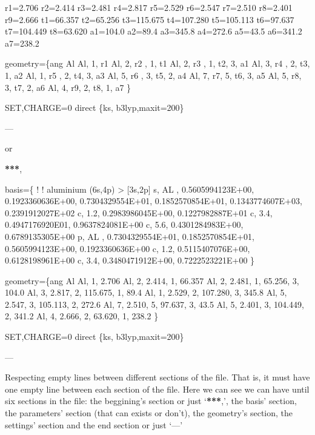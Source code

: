 \documentclass[letterpaper,10pt,english]{sphinxmanual}
\begin{document}
\begin{fulllineitems}
\begin{fulllineitems}
\sphinxAtStartPar
r1=2.706
r2=2.414
r3=2.481
r4=2.817
r5=2.529
r6=2.547
r7=2.510
r8=2.401
r9=2.666
t1=66.357
t2=65.256
t3=115.675
t4=107.280
t5=105.113
t6=97.637
t7=104.449
t8=63.620
a1=104.0
a2=89.4
a3=345.8
a4=272.6
a5=43.5
a6=341.2
a7=238.2

\sphinxAtStartPar
geometry=\{ang
Al
Al,  1,     r1
Al,  2,     r2 ,    1,      t1
Al,  2,     r3 ,    1,     t2,       3,    a1
Al,  3,     r4 ,    2,     t3,       1,     a2
Al,  1,     r5 ,    2,     t4,       3,    a3
Al,  5,     r6 ,    3,     t5,       2,    a4
Al,  7,     r7,     5,      t6,      3,     a5
Al,  5,     r8,     3,      t7,      2,    a6
Al,  4,     r9,     2,      t8,      1,     a7
\}

\sphinxAtStartPar
SET,CHARGE=0
direct
\{ks, b3lyp,maxit=200\}

\sphinxAtStartPar
—

\sphinxAtStartPar
or

\sphinxAtStartPar
{\color{red}\bfseries{}**}{\color{red}\bfseries{}*},

\sphinxAtStartPar
basis=\{
!
! aluminium            (6s,4p) \sphinxhyphen{}\textgreater{} {[}3s,2p{]}
s, AL , 0.5605994123E+00, 0.1923360636E+00, 0.7304329554E+01, 0.1852570854E+01, 0.1343774607E+03, 0.2391912027E+02
c, 1.2, \sphinxhyphen{}0.2983986045E+00, 0.1227982887E+01
c, 3.4, 0.4947176920E\sphinxhyphen{}01, 0.9637824081E+00
c, 5.6, 0.4301284983E+00, 0.6789135305E+00
p, AL , 0.7304329554E+01, 0.1852570854E+01, 0.5605994123E+00, 0.1923360636E+00
c, 1.2, 0.5115407076E+00, 0.6128198961E+00
c, 3.4, 0.3480471912E+00, 0.7222523221E+00
\}

\sphinxAtStartPar
geometry=\{ang
Al
Al,  1,     2.706
Al,  2,     2.414,     1,      66.357
Al,  2,     2.481,     1,      65.256,       3,     104.0
Al,  3,     2.817,     2,      115.675,      1,     89.4
Al,  1,     2.529,     2,      107.280,      3,     345.8
Al,  5,     2.547,     3,      105.113,      2,     272.6
Al,  7,     2.510,     5,      97.637,       3,     43.5
Al,  5,     2.401,     3,      104.449,      2,     341.2
Al,  4,     2.666,     2,      63.620,       1,     238.2
\}

\sphinxAtStartPar
SET,CHARGE=0
direct
\{ks, b3lyp,maxit=200\}

\sphinxAtStartPar
—

\sphinxAtStartPar
Respecting empty lines between different sections of the file. That is, it must have one empty line between each
section of the file. Here we can see we can have until six sections in the file: the beggining’s section or just
‘{\color{red}\bfseries{}**}{\color{red}\bfseries{}*},’, the basis’ section, the parameters’ section (that can exists or don’t), the geometry’s section, the
settings’ section and the end section or just ‘—’


\end{fulllineitems}
\end{fulllineitems}
\end{document}
